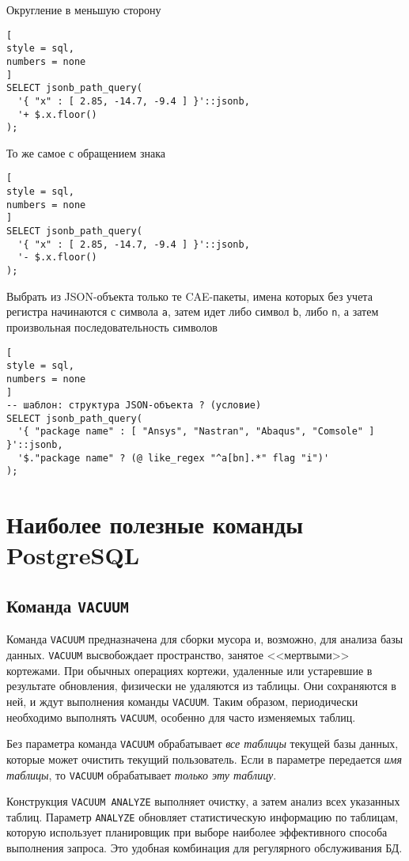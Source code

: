 \documentclass[%
	11pt,
	a4paper,
	utf8,
		]{article}
\begin{document}
Округление в меньшую сторону
\begin{lstlisting}[
style = sql,
numbers = none
]
SELECT jsonb_path_query(
  '{ "x" : [ 2.85, -14.7, -9.4 ] }'::jsonb,
  '+ $.x.floor()
);
\end{lstlisting}

То же самое с обращением знака
\begin{lstlisting}[
style = sql,
numbers = none
]
SELECT jsonb_path_query(
  '{ "x" : [ 2.85, -14.7, -9.4 ] }'::jsonb,
  '- $.x.floor()
);
\end{lstlisting}

Выбрать из JSON-объекта только те CAE-пакеты, имена которых без учета регистра начинаются с символа \texttt{a}, затем идет либо символ \texttt{b}, либо \texttt{n}, а затем произвольная последовательность символов
\begin{lstlisting}[
style = sql,
numbers = none
]
-- шаблон: структура JSON-объекта ? (условие)
SELECT jsonb_path_query(
  '{ "package name" : [ "Ansys", "Nastran", "Abaqus", "Comsole" ] }'::jsonb,
  '$."package name" ? (@ like_regex "^a[bn].*" flag "i")'
);
\end{lstlisting}



\section{Наиболее полезные команды PostgreSQL}

\subsection{Команда \texttt{VACUUM}}

Команда \texttt{VACUUM} предназначена для сборки мусора и, возможно, для анализа базы данных. \texttt{VACUUM} высвобождает пространство, занятое <<мертвыми>> кортежами. При обычных операциях кортежи, удаленные или устаревшие в результате обновления, физически не удаляются из таблицы. Они сохраняются в ней, и ждут выполнения команды \texttt{VACUUM}. Таким образом, периодически необходимо выполнять \texttt{VACUUM}, особенно для часто изменяемых таблиц.

Без параметра команда \texttt{VACUUM} обрабатывает \emph{все таблицы} текущей базы данных, которые может очистить текущий пользователь. Если в параметре передается \emph{имя таблицы}, то \texttt{VACUUM} обрабатывает \emph{только эту таблицу}.

Конструкция \texttt{VACUUM ANALYZE} выполняет очистку, а затем анализ всех указанных таблиц. Параметр \texttt{ANALYZE} обновляет статистическую информацию по таблицам, которую использует планировщик при выборе наиболее эффективного способа выполнения запроса. Это удобная комбинация для регулярного обслуживания БД.
\end{document}
